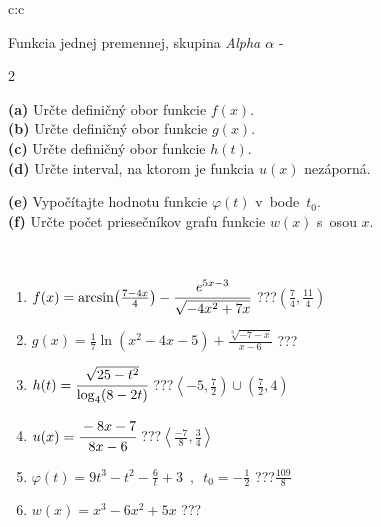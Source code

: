 \documentclass[10pt]{report}
\begin{document}
\begin{tabular}{c:c}
\begin{minipage}[c][104.5mm][t]{0.5\linewidth}
\begin{center}
\vspace{7mm}
{\huge Funkcia jednej premennej, skupina \textit{Alpha $\alpha$} -}\\[5mm]
\begin{minipage}{0.95\linewidth}
\begin{center}
{\small \begin{multicols}{2} \raggedright
\textbf{(a)} Určte definičný obor funkcie \(f(x)\). \\[1mm]
\textbf{(b)} Určte definičný obor funkcie \(g(x)\). \\[1mm]
\textbf{(c)} Určte definičný obor funkcie \(h(t)\). \\[1mm]
\textbf{(d)} Určte interval, na ktorom je funkcia \(u(x)\) nezáporná. \par \columnbreak
\textbf{(e)} Vypočítajte hodnotu funkcie \(\varphi(t)\) v~bode~\(t_0\). \\[1mm]
\textbf{(f)} Určte počet priesečníkov grafu funkcie \(w(x)\) s~osou \(x\). \\[1mm]
\end{multicols}
}
\end{center}
\end{minipage}
\\[4mm]
\begin{minipage}{0.79\linewidth}
\begin{center}
\begin{varwidth}{\linewidth}
\begin{enumerate}
\small
\item $f(x) = \arcsin\!\left( \frac{7-4x}{4} \right) - \cfrac{e^{5x-3}}{\sqrt{-4x^2+7x}}$\quad \dotfill\; ???\;\dotfill \quad $\left(\frac{7}{4} , \frac{11}{4}\right)$
\item $g(x) = \frac{1}{7} \ln{\!(x^2-4x-5)}+\frac{\sqrt[3]{-7-x}}{x-6}$\quad \dotfill\; ???\;\dotfill {}
\item $h(t) = \cfrac{\sqrt{25-t^2}}{\log_4(8-2t)}$\quad \dotfill\; ???\;\dotfill \quad $\left\langle-5 , \frac{7}{2}\right)\cup\left(\frac{7}{2} , 4\right)$
\item $u(x) = \cfrac{-8x-7}{8x-6}$\quad \dotfill\; ???\;\dotfill \quad $\left\langle\frac{-7}{8} , \frac{3}{4}\right\rangle$
\item $\varphi(t) = 9t^3-t^2-\frac{6}{t}+3 \enspace , \enspace t_0=-\frac{1}{2}$\quad \dotfill\; ???\;\dotfill \quad $\frac{109}{8}$
\item $w(x) = x^3-6x^2+5x$\quad \dotfill\; ???\;\dotfill {}

\end{enumerate}
\end{varwidth}
\end{center}
\end{minipage}
\end{center}
\end{minipage}
\end{tabular}
\end{document}
